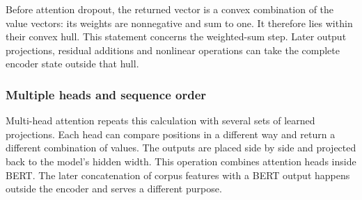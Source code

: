 \documentclass[10pt,letterpaper]{article}
\begin{document}
Before attention dropout, the returned vector is a convex combination of the value vectors: its weights are nonnegative and sum to one. It therefore lies within their convex hull. This statement concerns the weighted-sum step. Later output projections, residual additions and nonlinear operations can take the complete encoder state outside that hull.\par

\subsubsection{Multiple heads and sequence order}
Multi-head attention repeats this calculation with several sets of learned projections. Each head can compare positions in a different way and return a different combination of values. The outputs are placed side by side and projected back to the model's hidden width. This operation combines attention heads inside BERT. The later concatenation of corpus features with a BERT output happens outside the encoder and serves a different purpose.\par
\end{document}

